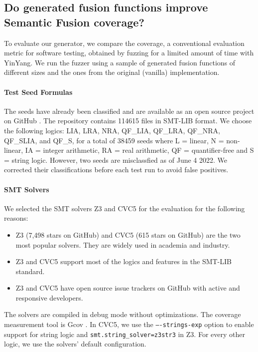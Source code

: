 \documentclass[sigplan,screen]{acmart}
\begin{document}
\subsection{Do generated fusion functions improve Semantic Fusion coverage?}

To evaluate our generator, we compare the coverage, a conventional evaluation metric for software testing, obtained by fuzzing for a limited amount of time with YinYang. We run the fuzzer using a sample of generated fusion functions of different sizes and the ones from the original (vanilla) implementation. 

\paragraph{Test Seed Formulas}
The seeds have already been classified and are available as an open source project on GitHub \cite{SEEDS}. The repository contains 114615 files in SMT-LIB format.
We choose the following logics: LIA, LRA, NRA, QF\_LIA,
QF\_LRA, QF\_NRA, QF\_SLIA, and QF\_S, for a total of 38459 seeds where L = linear,
N = non-linear, IA = integer arithmetic,
RA = real arithmetic, QF = quantifier-free and S = string logic. However, two seeds are misclassfied as of June 4 2022. We corrected their classifications before each test run to avoid false positives.

\paragraph{SMT Solvers} We selected the SMT solvers Z3 \cite{z3} and CVC5 \cite{cvc5} for the evaluation for the following reasons:
\begin{itemize}
    \item Z3 (7,498 stars on GitHub) and CVC5 (615 stars on GitHub) are the two most popular solvers. They are widely used in academia and industry.
    \item Z3 and CVC5 support most of the logics and features in the SMT-LIB standard.
    \item Z3 and CVC5 have open source issue trackers on GitHub with active and responsive developers.
\end{itemize}

The solvers are compiled in debug mode without optimizations. The coverage measurement tool is Gcov \cite{GCOV}. In CVC5, we use the \texttt{----strings-exp} option to enable support for string logic and \texttt{smt.string\_solver=z3str3} in Z3. For every other logic, we use the solvers' default configuration.
\end{document}
